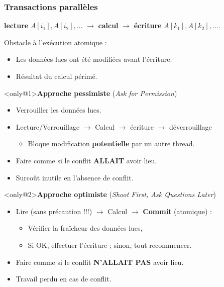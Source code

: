 \documentclass[xcolor={x11names,svgnames}]{beamer}
\begin{document}
\begin{frame}[label=transactions]
  \frametitle{Transactions parallèles}

  \textbf{lecture} $A[i_1], A[i_2], \dots$ $\rightarrow$ \textbf{calcul} $\rightarrow$ \textbf{écriture} $A[k_1], A[k_2], \dots$.

  \medskip

  \begin{block}{Obstacle à l'exécution \og atomique\fg{} :}
    \begin{itemize}
    \item Les données lues ont été modifiées avant l'écriture.
    \item Résultat du calcul \og périmé\fg{}.
    \end{itemize}
  \end{block}
  
  \begin{overlayarea}{\textwidth}{4cm}
  \begin{alertblock}<only@1>{\textbf{Approche pessimiste} (\og \textit{Ask for Permission}\fg{})}
    \begin{itemize}
    \item \og Verrouiller\fg{} les données lues.
    \item Lecture/Verrouillage $\rightarrow$ Calcul $\rightarrow$ écriture $\rightarrow$ déverrouillage
      \begin{itemize}
      \item Bloque modification \textbf{potentielle} par un autre thread.
      \end{itemize}
    \item Faire comme si le conflit \textbf{ALLAIT} avoir lieu.
    \item Surcoût inutile en l'absence de conflit.
    \end{itemize}
  \end{alertblock}

  \begin{exampleblock}<only@2>{\textbf{Approche optimiste} (\og \textit{Shoot First, Ask Questions Later}\fg{})}
    \begin{itemize}
    \item Lire (\alert{sans précaution !!!}) $\rightarrow$ Calcul $\rightarrow$ \textbf{Commit} (atomique) :
      \begin{itemize}
      \item Vérifier la fraîcheur des données lues,
      \item Si OK, effectuer l'écriture ; sinon, tout recommencer.
      \end{itemize}
    \item Faire comme si le conflit \textbf{N'ALLAIT PAS} avoir lieu.
    \item Travail perdu en cas de conflit.
    \end{itemize}
  \end{exampleblock}    
\end{overlayarea}
\end{frame}
\end{document}
